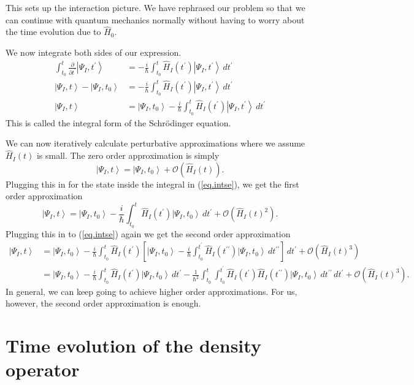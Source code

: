 \documentclass[11pt]{article}
\newcommand{\Od}[1]{\mathcal{O}{\left(#1\right)}}
\newcommand{\ket}[1]{\left|#1\right\rangle}
\newcommand{\op}[1]{\hat{#1}}
\theoremstyle{theorem}
\theoremstyle{remark}
\theoremstyle{step}
\theoremstyle{gap}
\begin{document}
This sets up the interaction picture. We have rephrased our problem so that we can continue with quantum mechanics normally without having to worry about the time evolution due to \(\op{H}_0\).

We now integrate both sides of our expression.
\begin{align}
\int_{t_0}^t \frac{\partial}{\partial t^\prime} \ket{\Psi_I, t^\prime} &= -\frac{i}{\hbar} \int_{t_0}^t \op{H}_I(t^\prime)\ket{\Psi_I, t^\prime} \,dt^\prime \nonumber\\
\ket{\Psi_I, t} - \ket{\Psi_I, t_0} &= -\frac{i}{\hbar} \int_{t_0}^t \op{H}_I(t^\prime)\ket{\Psi_I, t^\prime} \,dt^\prime \nonumber\\
\ket{\Psi_I, t} &= \ket{\Psi_I, t_0} - \frac{i}{\hbar} \int_{t_0}^t \op{H}_I(t^\prime)\ket{\Psi_I, t^\prime} \,dt^\prime \label{eq.intse}
\end{align}
This is called the integral form of the Schr\"odinger equation.

We can now iteratively calculate perturbative approximations where we assume \(\op{H}_I(t)\) is small. The zero order approximation is simply
\[\ket{\Psi_I, t} = \ket{\Psi_I, t_0} + \Od{\op{H}_I(t)}.\]
Plugging this in for the state inside the integral in (\ref{eq.intse}), we get the first order approximation
\begin{equation}\label{eq.firsttdpe}
\ket{\Psi_I, t} = \ket{\Psi_I, t_0} - \frac{i}{\hbar} \int_{t_0}^t \op{H}_I(t^\prime)\ket{\Psi_I, t_0} \,dt^\prime + \Od{\op{H}_I(t)^2}.
\end{equation}
Plugging this in to (\ref{eq.intse}) again we get the second order approximation
\begin{align}\nonumber
\ket{\Psi_I, t} &= \ket{\Psi_I, t_0} - \frac{i}{\hbar} \int_{t_0}^t \op{H}_I(t^\prime)\left[\ket{\Psi_I, t_0} - \frac{i}{\hbar} \int_{t_0}^{t^\prime} \op{H}_I(t^{\prime\prime})\ket{\Psi_I, t_0} \,dt^{\prime\prime}\right] \,dt^\prime + \Od{\op{H}_I(t)^3} \\
&= \ket{\Psi_I, t_0} - \frac{i}{\hbar}\int_{t_0}^t \op{H}_I (t^\prime) \ket{\Psi_I, t_0}\,dt^\prime - \frac{1}{\hbar^2} \int_{t_0}^t \int_{t_0}^{t^\prime} \op{H}_I(t^\prime) \op{H}_I(t^{\prime\prime})\ket{\Psi_I, t_0} \,dt^{\prime\prime}\,dt^\prime + \Od{\op{H}_I(t)^3}.
\label{eq.secondtdpe}\end{align}
In general, we can keep going to achieve higher order approximations. For us, however, the second order approximation is enough.


\section{Time evolution of the density operator}
\end{document}
